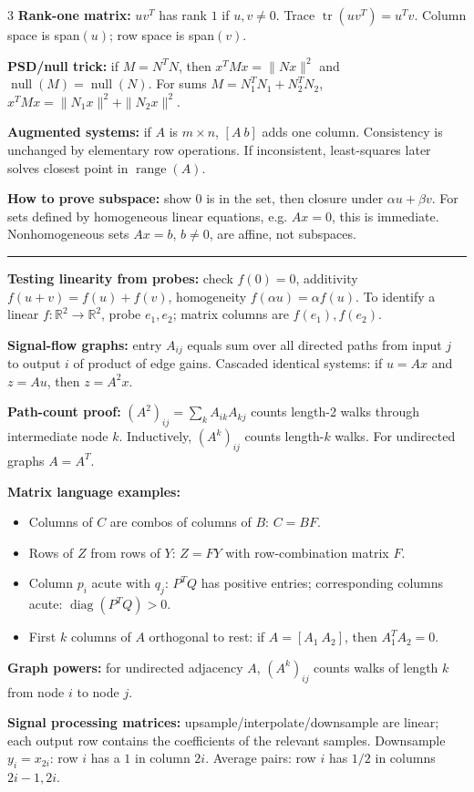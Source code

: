 \documentclass[10pt]{article}
\newcommand{\sect}[1]{\vspace{0.9pt}{\fontsize{7.2}{7.5}\selectfont\textbf{#1}}\vspace{0.25pt}\hrule\vspace{0.8pt}}
\newcommand{\sub}[1]{\textbf{#1}}
\newcommand{\R}{\mathbb{R}}
\newcommand{\range}{\operatorname{range}}
\newcommand{\nullsp}{\operatorname{null}}
\newcommand{\diag}{\operatorname{diag}}
\newcommand{\tr}{\operatorname{tr}}
\begin{document}
\begin{multicols*}{3}
\sub{Rank-one matrix:} $uv^T$ has rank $1$ if $u,v\ne0$. Trace $\tr(uv^T)=u^Tv$. Column space is span$(u)$; row space is span$(v)$.

\sub{PSD/null trick:} if $M=N^TN$, then $x^TMx=\|Nx\|^2$ and $\nullsp(M)=\nullsp(N)$. For sums $M=N_1^TN_1+N_2^TN_2$, $x^TMx=\|N_1x\|^2+\|N_2x\|^2$.

\sub{Augmented systems:} if $A$ is $m\times n$, $[A\ b]$ adds one column. Consistency is unchanged by elementary row operations. If inconsistent, least-squares later solves closest point in $\range(A)$.

\sub{How to prove subspace:} show $0$ is in the set, then closure under $\alpha u+\beta v$. For sets defined by homogeneous linear equations, e.g. $Ax=0$, this is immediate. Nonhomogeneous sets $Ax=b$, $b\ne0$, are affine, not subspaces.

\sect{HW1 Patterns}
\sub{Testing linearity from probes:} check $f(0)=0$, additivity $f(u+v)=f(u)+f(v)$, homogeneity $f(\alpha u)=\alpha f(u)$. To identify a linear $f:\R^2\to\R^2$, probe $e_1,e_2$; matrix columns are $f(e_1),f(e_2)$.

\sub{Signal-flow graphs:} entry $A_{ij}$ equals sum over all directed paths from input $j$ to output $i$ of product of edge gains. Cascaded identical systems: if $u=Ax$ and $z=Au$, then $z=A^2x$.

\sub{Path-count proof:} $(A^2)_{ij}=\sum_kA_{ik}A_{kj}$ counts length-2 walks through intermediate node $k$. Inductively, $(A^k)_{ij}$ counts length-$k$ walks. For undirected graphs $A=A^T$.

\sub{Matrix language examples:}
\begin{itemize}
\item Columns of $C$ are combos of columns of $B$: $C=BF$.
\item Rows of $Z$ from rows of $Y$: $Z=FY$ with row-combination matrix $F$.
\item Column $p_i$ acute with $q_j$: $P^TQ$ has positive entries; corresponding columns acute: $\diag(P^TQ)>0$.
\item First $k$ columns of $A$ orthogonal to rest: if $A=[A_1\ A_2]$, then $A_1^TA_2=0$.
\end{itemize}

\sub{Graph powers:} for undirected adjacency $A$, $(A^k)_{ij}$ counts walks of length $k$ from node $i$ to node $j$.

\sub{Signal processing matrices:} upsample/interpolate/downsample are linear; each output row contains the coefficients of the relevant samples. Downsample $y_i=x_{2i}$: row $i$ has a $1$ in column $2i$. Average pairs: row $i$ has $1/2$ in columns $2i-1,2i$.


\end{multicols*}
\end{document}
